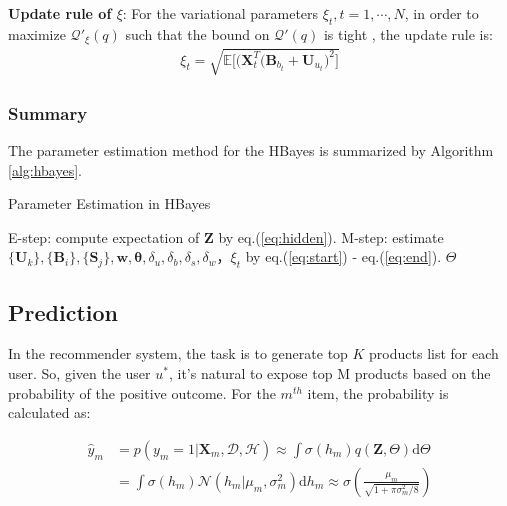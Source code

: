 \noindent \textbf{Update rule of $\xi$}:
For the variational parameters $\xi_{t}, t=1,\cdots,N$, in order to maximize $\mathcal{Q}'_{\xi}(q)$ such that the bound on $\mathcal{Q}'(q)$ is tight \cite{bishop2006pattern}, the update rule is: 
\begin{align}
\xi_{t}=\sqrt{\mathbb{E}\Big[\big(\bm{X}_t^T(\mathbf{B}_{b_t}+\mathbf{U}_{u_t}\big)^2\Big]}
\label{eq:end}
\end{align}


\subsubsection{Summary}
The parameter estimation method for the HBayes is summarized by Algorithm \ref{alg:hbayes}.

\begin{algorithm}
\caption{Parameter Estimation in HBayes}
\label{alg:hbayes}
\begin{algorithmic}[1]

\Repeat
\State E-step: compute expectation of $\mathbf{Z}$ by eq.(\ref{eq:hidden}).
\State M-step: estimate $\{\bm{U}_k\}, \{\bm{B}_i\}, \{\bm{S}_j\}, \bm{w}, \boldsymbol{\theta}, \delta_u,\delta_b,\delta_s,\delta_w，\xi_{t}$ by eq.(\ref{eq:start}) - eq.(\ref{eq:end}).
\State
\Return $\Theta$
\EndProcedure
\end{algorithmic}
\end{algorithm}

\subsection{Prediction}

In the recommender system, the task is to generate top $K$ products list for each user. So, given the user $u^*$,  it's natural to expose top M products based on the probability of the positive outcome. For the $m^{th}$ item, the probability is calculated as:

\begin{equation}
\label{prediction}
\begin{split}
\hat{y}_m & = p(y_m=1|\bm{X}_m,\mathcal{D},\mathcal{H}) \approx \int \sigma(h_{m})q(\bm{Z},\Theta)\mathrm{d}\Theta \nonumber \\
& = \int \sigma(h_{m})\mathcal{N}(h_{m}|\mu_{m},\sigma^2_{m})\mathrm{d}h_{m} \approx \sigma(\frac{\mu_{m}}{\sqrt{1+\pi\sigma^2_{m}/8}})
\end{split}
\end{equation}

